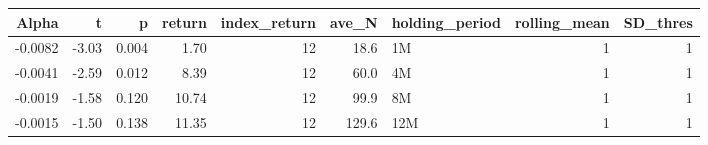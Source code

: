 \begin{table}[ht]
\centering
\begin{tabular}{rrrrrrlrr}
  \hline
Alpha & t & p & return & index\_return & ave\_N & holding\_period & rolling\_mean & SD\_thres \\ 
  \hline
-0.0082 & -3.03 & 0.004 & 1.70 & 12 & 18.6 & 1M &  1 &  1 \\ 
  -0.0041 & -2.59 & 0.012 & 8.39 & 12 & 60.0 & 4M &  1 &  1 \\ 
  -0.0019 & -1.58 & 0.120 & 10.74 & 12 & 99.9 & 8M &  1 &  1 \\ 
  -0.0015 & -1.50 & 0.138 & 11.35 & 12 & 129.6 & 12M &  1 &  1 \\ 
   \hline
\end{tabular}
\end{table}

